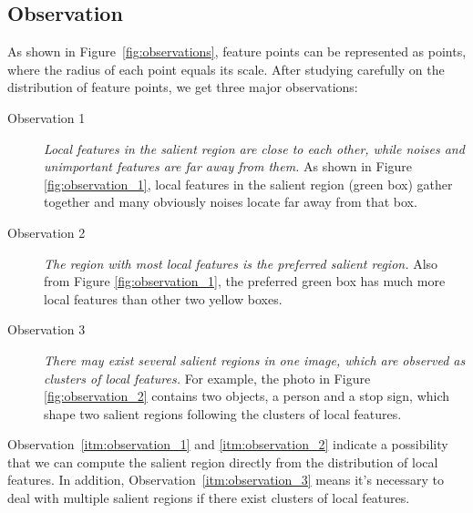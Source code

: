 \subsection{Observation}

As shown in Figure~\ref{fig:observations}, feature points can be represented as points, where the radius of each point equals its scale. After studying carefully on the distribution of feature points, we get three major observations:

\begin{description}
	
	\item[Observation 1]  \textit{Local features in the salient region are close to each other, while noises and unimportant features are far away from them.} As shown in Figure \ref{fig:observation_1}, local features in the salient region (green box) gather together and many obviously noises locate far away from that box. 

	\item[Observation 2]  \textit{The region with most local features is the preferred salient region.} Also from Figure \ref{fig:observation_1}, the preferred green box has much more local features than other two yellow boxes. 

	\item[Observation 3]  \textit{There may exist several salient regions in one image, which are observed as clusters of local features.} For example, the photo in Figure \ref{fig:observation_2} contains two objects, a person and a stop sign, which shape two salient regions following the clusters of local features.

\end{description}

Observation~\ref{itm:observation_1} and \ref{itm:observation_2} indicate a possibility that we can compute the salient region directly from the distribution of local features. In addition, Observation~\ref{itm:observation_3} means it's necessary to deal with multiple salient regions if there exist clusters of local features.
